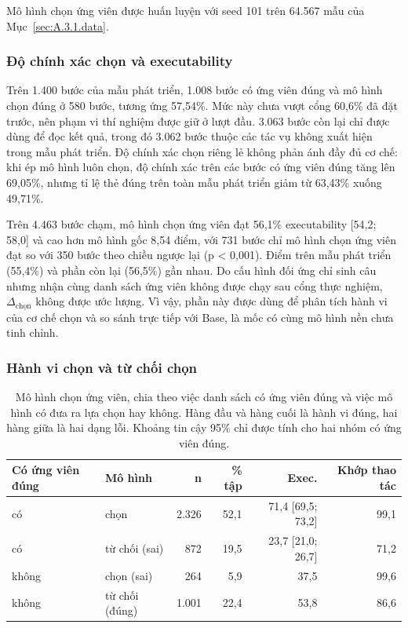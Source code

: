Mô hình chọn ứng viên được huấn luyện với seed 101 trên 64.567 mẫu của Mục~\ref{sec:A.3.1.data}.

\subsubsection{Độ chính xác chọn và executability}\label{sec:A.3.2.1}

Trên 1.400 bước của mẫu phát triển, 1.008 bước có ứng viên đúng và mô hình chọn đúng ở 580 bước, tương ứng 57,54\%. Mức này chưa vượt cổng 60,6\% đã đặt trước, nên phạm vi thí nghiệm được giữ ở lượt đầu. 3.063 bước còn lại chỉ được dùng để đọc kết quả, trong đó 3.062 bước thuộc các tác vụ không xuất hiện trong mẫu phát triển. Độ chính xác chọn riêng lẻ không phản ánh đầy đủ cơ chế: khi ép mô hình luôn chọn, độ chính xác trên các bước có ứng viên đúng tăng lên 69,05\%, nhưng tỉ lệ thẻ đúng trên toàn mẫu phát triển giảm từ 63,43\% xuống 49,71\%.

Trên 4.463 bước chạm, mô hình chọn ứng viên đạt 56,1\% executability [54,2; 58,0] và cao hơn mô hình gốc 8,54 điểm, với 731 bước chỉ mô hình chọn ứng viên đạt so với 350 bước theo chiều ngược lại (p < 0,001). Điểm trên mẫu phát triển (55,4\%) và phần còn lại (56,5\%) gần nhau. Do cấu hình đối ứng chỉ sinh câu nhưng nhận cùng danh sách ứng viên không được chạy sau cổng thực nghiệm, $\Delta_{\text{chọn}}$ không được ước lượng. Vì vậy, phần này được dùng để phân tích hành vi của cơ chế chọn và so sánh trực tiếp với Base, là mốc có cùng mô hình nền chưa tinh chỉnh.

\subsubsection{Hành vi chọn và từ chối chọn}\label{sec:A.3.2.2}

\begin{table}[htbp]
\centering\small
\caption[Mô hình chọn ứng viên, chia theo việc danh sách có ứng viên đúng và việc mô hình có đưa ra lựa chọn hay không.]{Mô hình chọn ứng viên, chia theo việc danh sách có ứng viên đúng và việc mô hình có đưa ra lựa chọn hay không. Hàng đầu và hàng cuối là hành vi đúng, hai hàng giữa là hai dạng lỗi. Khoảng tin cậy 95\% chỉ được tính cho hai nhóm có ứng viên đúng.}\label{tab:A.8}
\setlength{\tabcolsep}{4pt}
\begin{tabularx}{\textwidth}{@{}llrrrr@{}}
\toprule
\textbf{Có ứng viên đúng} & \textbf{Mô hình} & \textbf{n} & \textbf{\% tập} & \textbf{Exec.} & \textbf{Khớp thao tác} \\
\midrule
có & chọn & 2.326 & 52,1 & 71,4 [69,5; 73,2] & 99,1 \\
có & từ chối (sai) & 872 & 19,5 & 23,7 [21,0; 26,7] & 71,2 \\
không & chọn (sai) & 264 & 5,9 & 37,5 & 99,6 \\
không & từ chối (đúng) & 1.001 & 22,4 & 53,8 & 86,6 \\
\bottomrule
\end{tabularx}
\end{table}

